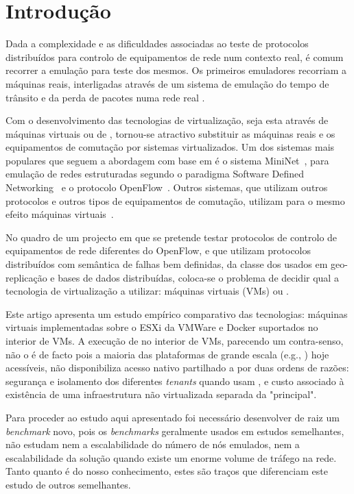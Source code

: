 
\section{Introdução}


Dada a complexidade e as dificuldades associadas ao teste de
protocolos distribuídos para controlo de equipamentos de rede num
contexto real, é comum recorrer a emulação para teste dos mesmos. Os
primeiros emuladores recorriam a máquinas reais, interligadas através
de um sistema de emulação do tempo de trânsito e da perda de pacotes
numa rede real \cite{ModelNet}.

Com o desenvolvimento das tecnologias de virtualização, seja esta através de
má\-qui\-nas virtuais ou de {\conts}, tornou-se atractivo substituir as
máquinas reais e os equipamentos de comutação por sistemas
virtualizados. Um dos sistemas mais populares que seguem a
abordagem com base em {\conts} é o sistema MiniNet~\cite{Lantz:2010:NLR:1868447.1868466}, para emulação de redes
estruturadas segundo o paradigma Software Defined Networking~\cite{sdnOverview}
e o protocolo OpenFlow~\cite{McKeown:2008:OEI:1355734.1355746}. Outros sistemas, que utilizam outros protocolos e outros
tipos de equipamentos de comutação, utilizam para o mesmo efeito
máquinas virtuais~\cite{1698543}.

No quadro de um projecto em que se pretende testar protocolos de
controlo de equipamentos de rede diferentes do
OpenFlow, e que utilizam protocolos distribuídos com semântica de falhas
bem definidas, da classe dos usados em geo-replicação e bases de dados distribuídas,
coloca-se o problema de decidir qual a tecnologia de virtualização a
utilizar: máquinas virtuais (VMs) ou {\conts}.

Este artigo apresenta um estudo empírico comparativo das tecnologias:
máquinas virtuais implementadas sobre o {\hiper}
ESXi da VMWare e {\conts} Docker suportados no interior de VMs.
A execução de {\conts} no interior de VMs, parecendo um contra-senso, 
não o é de facto pois a maioria das plataformas de grande escala (e.g., \clouds)
hoje acessíveis, não disponibiliza acesso nativo partilhado a
{\conts} por duas ordens de razões: segurança e isolamento dos diferentes \textit{tenants} quando usam {\conts}, 
e custo associado à existência de uma infraestrutura não virtualizada separada da "principal".

Para proceder ao estudo aqui apresentado foi necessário desenvolver de raiz um \textit{benchmark} novo,
pois os \textit{benchmarks} geralmente usados em estudos semelhantes, 
não estudam nem a escalabilidade do número de nós emulados,
nem a escalabilidade da solução quando existe um enorme volume de tráfego na rede. 
Tanto quanto é do nosso conhecimento, estes são traços que diferenciam este estudo de outros semelhantes.

